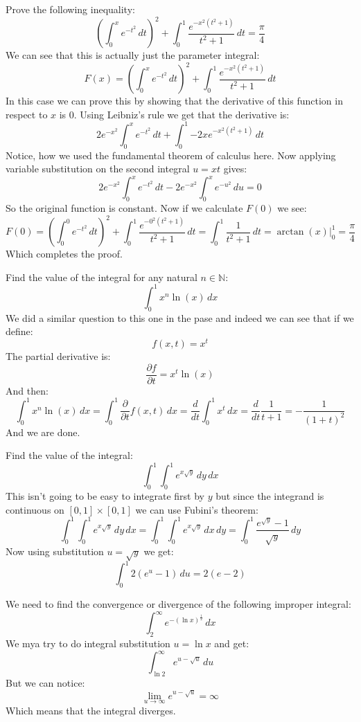 \documentclass{article}
\theoremstyle{plain}
\newcommand{\N}{\mathbb{N}}
\begin{document}
	\newpage
	
	Prove the following inequality:
	\[
		\left(\int_{0}^{x}{e^{-t^2}\,dt}\right)^2 + 
		\int_{0}^{1}{\frac{e^{-x^2(t^2+1)}}{t^2+1}\,dt} = 
		\frac{\pi}{4}
	\]
	We can see that this is actually just the parameter integral:
	\[
		F(x) = \left(\int_{0}^{x}{e^{-t^2}\,dt}\right)^2 + 
		\int_{0}^{1}{\frac{e^{-x^2(t^2+1)}}{t^2+1}\,dt}
	\]
	In this
	case we can prove this by showing that the derivative of this function
	in respect to $x$ is $0$. Using Leibniz's rule we get that
	the derivative is:
	\[
		2e^{-x^2}\int_{0}^{x}{e^{-t^2}\,dt} + 
		\int_{0}^{1}{-2xe^{-x^2(t^2+1)}\,dt}
	\]
	Notice, how we used the fundamental theorem of calculus here.
	Now applying variable substitution on the second integral $u=xt$ gives:
	\[
		2e^{-x^2}\int_{0}^{x}{e^{-t^2}\,dt} - 
		2e^{-x^2}\int_{0}^{x}{e^{-u^2}\,du} = 0
	\]
	So the original function is constant. Now if we calculate $F(0)$
	we see:
	\[
		F(0) = \left(\int_{0}^{0}{e^{-t^2}\,dt}\right)^2 + 
		\int_{0}^{1}{\frac{e^{-0^2(t^2+1)}}{t^2+1}\,dt} = 
		\int_{0}^{1}{\frac{1}{t^2+1}\,dt} = 
		\arctan(x)\vert_0^1 = \frac{\pi}{4}
	\]
	Which completes the proof.
	
	\newpage
	
	Find the value of the integral for any natural $n\in\N$:
	\[
		\int_{0}^{1}{x^n\ln(x)\,dx}
	\]
	We did a similar question to this one in the pase and indeed we can
	see that if we define:
	\[
		f(x,t) = x^t
	\]
	The partial derivative is:
	\[
		\frac{\partial f}{\partial t} = x^t \ln(x)
	\]
	And then:
	\[
		\int_{0}^{1}{x^n\ln(x)\,dx} = 
		\int_{0}^{1}{\frac{\partial}{\partial t}f(x,t)\,dx} = 
		\frac{d}{dt}\int_{0}^{1}{x^t\,dx} = 
		\frac{d}{dt}\frac{1}{t+1} =
		-\frac{1}{(1+t)^2}
	\]
	And we are done.
	
	\newpage
	
	Find the value of the integral:
	\[
		\int_{0}^{1}
		{
			\int_{0}^{1}
			{
				e^{x\sqrt{y}}
			}\,dy
		}\,dx
	\]
	This isn't going to be easy to integrate first by $y$ but since
	the integrand is continuous on $[0,1]\times[0,1]$ we can use
	Fubini's theorem:
	\[
		\int_{0}^{1}
		{
			\int_{0}^{1}
			{
				e^{x\sqrt{y}}
			}\,dy
		}\,dx =
		\int_{0}^{1}
		{
			\int_{0}^{1}
			{
				e^{x\sqrt{y}}
			}\,dx
		}\,dy =
		\int_{0}^{1}
		{
			\frac{e^{\sqrt{y}}-1}{\sqrt{y}}
		}\,dy
	\]
	Now using substitution $u = \sqrt{y}$ we get:
	\[
		\int_{0}^{1}
		{
			2(e^u-1)
		}\,du =
		2(e - 2)
	\]
	
	\newpage
	
	We need to find the convergence or divergence of the following improper
	integral:
	\[
		\int_{2}^{\infty}{e^{-(\ln x)^{\frac{1}{2}}}\,dx}
	\]
	We mya try to do integral substitution $u = \ln x$ and get:
	\[
		\int_{\ln 2}^{\infty}{e^{u-\sqrt{u}}\,du}
	\]
	But we can notice:
	\[
		\lim_{u\to\infty}{e^{u-\sqrt{u}}} = \infty
	\]
	Which means that the integral diverges.
	
\end{document}
